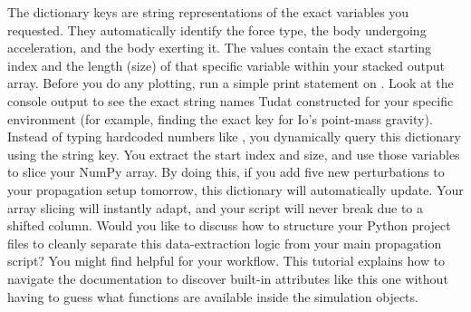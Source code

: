 {}\markdownRendererUlBegin
\markdownRendererUlItem {} The dictionary keys are string representations of the exact variables you requested. They automatically identify the force type, the body undergoing acceleration, and the body exerting it.\markdownRendererUlItemEnd 
\markdownRendererUlItem {} The values contain the exact starting index and the length (size) of that specific variable within your stacked output array.\markdownRendererUlItemEnd 
\markdownRendererUlEnd \markdownRendererInterblockSeparator
{}
\markdownRendererSectionEnd \markdownRendererSectionBegin
{}\markdownRendererInterblockSeparator
{}\markdownRendererOlBegin
{} Before you do any plotting, run a simple print statement on .\markdownRendererOlItemEnd 
{} Look at the console output to see the exact string names Tudat constructed for your specific environment (for example, finding the exact key for Io's point-mass gravity).\markdownRendererOlItemEnd 
{} Instead of typing hardcoded numbers like \markdownRendererCodeSpan{[9:12]}, you dynamically query this dictionary using the string key. You extract the start index and size, and use those variables to slice your NumPy array.\markdownRendererOlItemEnd 
\markdownRendererOlEnd \markdownRendererInterblockSeparator
{}By doing this, if you add five new perturbations to your propagation setup tomorrow, this dictionary will automatically update. Your array slicing will instantly adapt, and your script will never break due to a shifted column.\markdownRendererInterblockSeparator
{}\markdownRendererThematicBreak{}\markdownRendererInterblockSeparator
{}Would you like to discuss how to structure your Python project files to cleanly separate this data-extraction logic from your main propagation script?\markdownRendererInterblockSeparator
{}You might find  helpful for your workflow. This tutorial explains how to navigate the documentation to discover built-in attributes like this one without having to guess what functions are available inside the simulation objects.\markdownRendererInterblockSeparator
